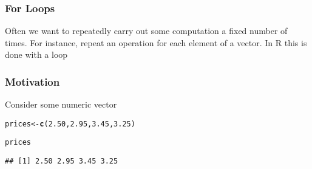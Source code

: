 \documentclass[12pt]{beamer}\usepackage[]{graphicx}\usepackage[]{color}
\makeatletter
\newcommand{\hlnum}[1]{\textcolor[rgb]{0.686,0.059,0.569}{#1}}%
\newcommand{\hlstd}[1]{\textcolor[rgb]{0.345,0.345,0.345}{#1}}%
\newcommand{\hlkwb}[1]{\textcolor[rgb]{0.69,0.353,0.396}{#1}}%
\newcommand{\hlkwd}[1]{\textcolor[rgb]{0.737,0.353,0.396}{\textbf{#1}}}%
\newenvironment{kframe}{%
 \def\at@end@of@kframe{}%
 \ifinner\ifhmode%
  \def\at@end@of@kframe{\end{minipage}}%
  \begin{minipage}{\columnwidth}%
 \fi\fi%
 \def\FrameCommand##1{\hskip\@totalleftmargin \hskip-\fboxsep
 \colorbox{shadecolor}{##1}\hskip-\fboxsep
     \hskip-\linewidth \hskip-\@totalleftmargin \hskip\columnwidth}%
 \MakeFramed {\advance\hsize-\width
   \@totalleftmargin\z@ \linewidth\hsize
   \@setminipage}}%
 {\par\unskip\endMakeFramed%
 \at@end@of@kframe}
\newenvironment{knitrout}{}{} %
\makeatother
\begin{document}

\begin{frame}
\begin{center}
\Huge{}
\end{center}
\end{frame}


\begin{frame}
\frametitle{For Loops}

Often we want to repeatedly carry out some computation a fixed number of times. For instance, repeat an operation for each element of a vector. In R this is done with a {\hilit {}} loop 

\end{frame}


\begin{frame}[fragile]
\frametitle{Motivation}

Consider some numeric vector
\begin{knitrout}\footnotesize
{}\color{fgcolor}\begin{kframe}
\begin{alltt}
\hlstd{prices} \hlkwb{<-} \hlkwd{c}\hlstd{(}\hlnum{2.50}\hlstd{,} \hlnum{2.95}\hlstd{,} \hlnum{3.45}\hlstd{,} \hlnum{3.25}\hlstd{)}

\hlstd{prices}
\end{alltt}
\begin{verbatim}
## [1] 2.50 2.95 3.45 3.25
\end{verbatim}
\end{kframe}
\end{knitrout}

\end{frame}

\end{document}
